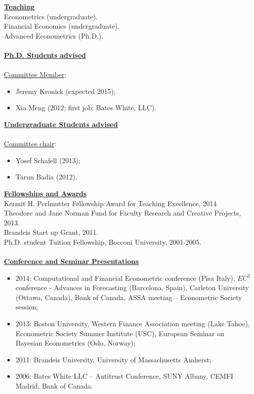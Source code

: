 \documentclass[12pt]{article}
\begin{document}
\underline{\textbf{Teaching}}\\
Econometrics (undergraduate).\\
Financial Economics (undergraduate). \\
Advanced Econometrics (Ph.D.). \\ \\
\underline{\textbf{Ph.D. Students advised}} \\ \\
\underline{Committee Member}: 
\begin{itemize}
	\item Jeremy Kronick (expected 2015);
	\item Xia Meng (2012; first job: Bates White, LLC). 
\end{itemize}
\clearpage
\underline{\textbf{Undergraduate Students advised}} \\ \\
\underline{Committee chair}: 
\begin{itemize}
	\item Yosef Schafell (2013);
	\item Tarun Badia (2012). 
\end{itemize}

\underline{\textbf{Fellowships and Awards}}\\
Kermit H. Perlmutter Fellowship Award for Teaching Excellence, 2014 \\
Theodore and Jane Norman Fund for Faculty Research and Creative Projects, 2013. \\
Brandeis Start up Grant, 2011. \\
Ph.D. student Tuition Fellowship, Bocconi University, 2001-2005.\\ \\
\underline{\textbf{Conference and Seminar Presentations}}
\begin{itemize}
	\item 2014: Computational and Financial Econometric conference (Pisa Italy), $EC^2$ conference - Advances in Forecasting (Barcelona, Spain),  Carleton University (Ottawa, Canada), Bank of Canada, ASSA meeting -- Econometric Society session;  
	\item 2013: Boston University, Western Finance Association meeting (Lake Tahoe), Econometric Society Summer Institute (USC), European Seminar on Bayesian Econometrics (Oslo, Norway); 
	\item 2011: Brandeis University, University of Massachusetts Amherst; 
	\item 2006: Bates White LLC -- Antitrust Conference, SUNY Albany, CEMFI Madrid, Bank of Canada.
\end{itemize}
\end{document}
